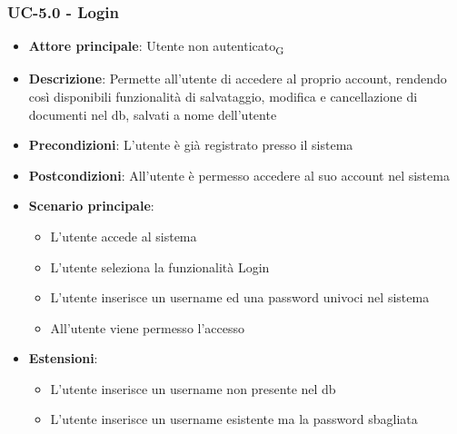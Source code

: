 \documentclass[11pt,a4paper]{article}
\newcommand{\gls}[1]{#1\textsubscript{G}}
\begin{document}
\subsubsection{UC-5.0 - Login}
\begin{itemize}
    \item \textbf{Attore principale}: \gls{Utente non autenticato}
    \item \textbf{Descrizione}: Permette all'utente di accedere al proprio account, rendendo così disponibili funzionalità di salvataggio, modifica e cancellazione di documenti nel db, salvati a nome dell'utente
    \item \textbf{Precondizioni}: L'utente è già registrato presso il sistema
    \item \textbf{Postcondizioni}: All'utente è permesso accedere al suo account nel sistema
    \item \textbf{Scenario principale}:
        \begin{itemize}
            \item L'utente accede al sistema
            \item L'utente seleziona la funzionalità Login
            \item L'utente inserisce un username ed una password univoci nel sistema
            \item All'utente viene permesso l'accesso
        \end{itemize}
    \item \textbf{Estensioni}:
        \begin{itemize}
            \item L'utente inserisce un username non presente nel db
            \item L'utente inserisce un username esistente ma la password sbagliata
        \end{itemize}
\end{itemize}
\end{document}
